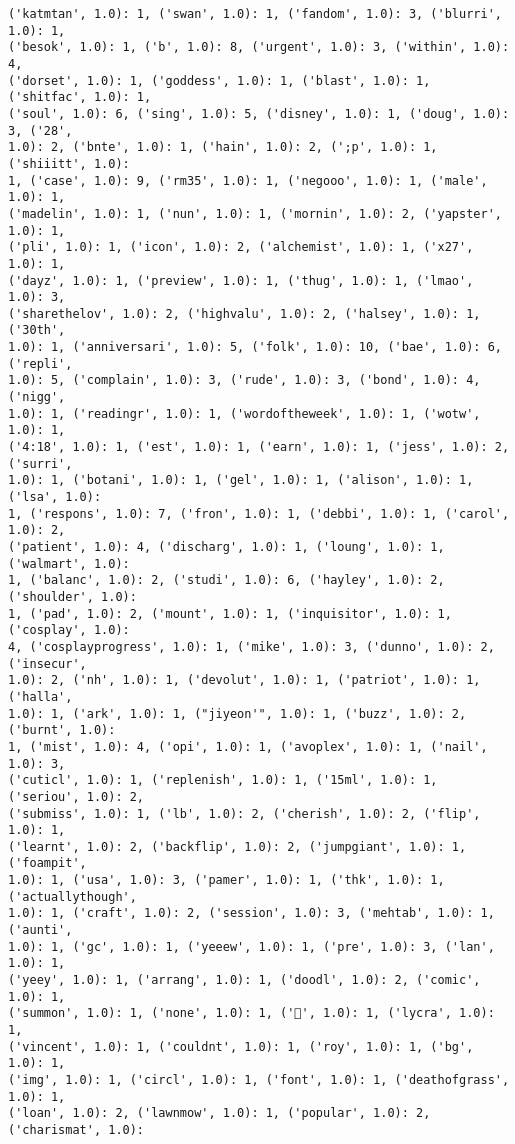 \documentclass[11pt]{article}
\begin{document}
\begin{Verbatim}[commandchars=\\\{\}]
('katmtan', 1.0): 1, ('swan', 1.0): 1, ('fandom', 1.0): 3, ('blurri', 1.0): 1,
('besok', 1.0): 1, ('b', 1.0): 8, ('urgent', 1.0): 3, ('within', 1.0): 4,
('dorset', 1.0): 1, ('goddess', 1.0): 1, ('blast', 1.0): 1, ('shitfac', 1.0): 1,
('soul', 1.0): 6, ('sing', 1.0): 5, ('disney', 1.0): 1, ('doug', 1.0): 3, ('28',
1.0): 2, ('bnte', 1.0): 1, ('hain', 1.0): 2, (';p', 1.0): 1, ('shiiitt', 1.0):
1, ('case', 1.0): 9, ('rm35', 1.0): 1, ('negooo', 1.0): 1, ('male', 1.0): 1,
('madelin', 1.0): 1, ('nun', 1.0): 1, ('mornin', 1.0): 2, ('yapster', 1.0): 1,
('pli', 1.0): 1, ('icon', 1.0): 2, ('alchemist', 1.0): 1, ('x27', 1.0): 1,
('dayz', 1.0): 1, ('preview', 1.0): 1, ('thug', 1.0): 1, ('lmao', 1.0): 3,
('sharethelov', 1.0): 2, ('highvalu', 1.0): 2, ('halsey', 1.0): 1, ('30th',
1.0): 1, ('anniversari', 1.0): 5, ('folk', 1.0): 10, ('bae', 1.0): 6, ('repli',
1.0): 5, ('complain', 1.0): 3, ('rude', 1.0): 3, ('bond', 1.0): 4, ('nigg',
1.0): 1, ('readingr', 1.0): 1, ('wordoftheweek', 1.0): 1, ('wotw', 1.0): 1,
('4:18', 1.0): 1, ('est', 1.0): 1, ('earn', 1.0): 1, ('jess', 1.0): 2, ('surri',
1.0): 1, ('botani', 1.0): 1, ('gel', 1.0): 1, ('alison', 1.0): 1, ('lsa', 1.0):
1, ('respons', 1.0): 7, ('fron', 1.0): 1, ('debbi', 1.0): 1, ('carol', 1.0): 2,
('patient', 1.0): 4, ('discharg', 1.0): 1, ('loung', 1.0): 1, ('walmart', 1.0):
1, ('balanc', 1.0): 2, ('studi', 1.0): 6, ('hayley', 1.0): 2, ('shoulder', 1.0):
1, ('pad', 1.0): 2, ('mount', 1.0): 1, ('inquisitor', 1.0): 1, ('cosplay', 1.0):
4, ('cosplayprogress', 1.0): 1, ('mike', 1.0): 3, ('dunno', 1.0): 2, ('insecur',
1.0): 2, ('nh', 1.0): 1, ('devolut', 1.0): 1, ('patriot', 1.0): 1, ('halla',
1.0): 1, ('ark', 1.0): 1, ("jiyeon'", 1.0): 1, ('buzz', 1.0): 2, ('burnt', 1.0):
1, ('mist', 1.0): 4, ('opi', 1.0): 1, ('avoplex', 1.0): 1, ('nail', 1.0): 3,
('cuticl', 1.0): 1, ('replenish', 1.0): 1, ('15ml', 1.0): 1, ('seriou', 1.0): 2,
('submiss', 1.0): 1, ('lb', 1.0): 2, ('cherish', 1.0): 2, ('flip', 1.0): 1,
('learnt', 1.0): 2, ('backflip', 1.0): 2, ('jumpgiant', 1.0): 1, ('foampit',
1.0): 1, ('usa', 1.0): 3, ('pamer', 1.0): 1, ('thk', 1.0): 1, ('actuallythough',
1.0): 1, ('craft', 1.0): 2, ('session', 1.0): 3, ('mehtab', 1.0): 1, ('aunti',
1.0): 1, ('gc', 1.0): 1, ('yeeew', 1.0): 1, ('pre', 1.0): 3, ('lan', 1.0): 1,
('yeey', 1.0): 1, ('arrang', 1.0): 1, ('doodl', 1.0): 2, ('comic', 1.0): 1,
('summon', 1.0): 1, ('none', 1.0): 1, ('🙅', 1.0): 1, ('lycra', 1.0): 1,
('vincent', 1.0): 1, ('couldnt', 1.0): 1, ('roy', 1.0): 1, ('bg', 1.0): 1,
('img', 1.0): 1, ('circl', 1.0): 1, ('font', 1.0): 1, ('deathofgrass', 1.0): 1,
('loan', 1.0): 2, ('lawnmow', 1.0): 1, ('popular', 1.0): 2, ('charismat', 1.0):

\end{Verbatim}
\end{document}
